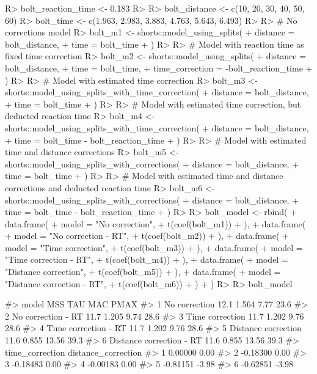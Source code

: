 \documentclass[
]{jss}
\begin{document}
\begin{CodeChunk}
\begin{CodeInput}
R> bolt_reaction_time <- 0.183
R> 
R> bolt_distance <- c(10, 20, 30, 40, 50, 60)
R> bolt_time <- c(1.963, 2.983, 3.883, 4.763, 5.643, 6.493)
R> 
R> # No corrections model
R> bolt_m1 <- shorts::model_using_splits(
+   distance = bolt_distance,
+   time = bolt_time
+ )
R> 
R> # Model with reaction time as fixed time correction
R> bolt_m2 <- shorts::model_using_splits(
+   distance = bolt_distance,
+   time = bolt_time,
+   time_correction = -bolt_reaction_time
+ )
R> 
R> # Model with estimated time correction
R> bolt_m3 <- shorts::model_using_splits_with_time_correction(
+   distance = bolt_distance,
+   time = bolt_time
+ )
R> 
R> # Model with estimated time correction, but deducted reaction time
R> bolt_m4 <- shorts::model_using_splits_with_time_correction(
+   distance = bolt_distance,
+   time = bolt_time - bolt_reaction_time
+ )
R> 
R> # Model with estimated time and distance corrections
R> bolt_m5 <- shorts::model_using_splits_with_corrections(
+   distance = bolt_distance,
+   time = bolt_time
+ )
R> 
R> # Model with estimated time and distance corrections and deducted reaction time
R> bolt_m6 <- shorts::model_using_splits_with_corrections(
+   distance = bolt_distance,
+   time = bolt_time - bolt_reaction_time
+ )
R> 
R> bolt_model <- rbind(
+   data.frame(
+     model = "No correction",
+     t(coef(bolt_m1))
+   ),
+   data.frame(
+     model = "No correction - RT",
+     t(coef(bolt_m2))
+   ),
+   data.frame(
+     model = "Time correction",
+     t(coef(bolt_m3))
+   ),
+   data.frame(
+     model = "Time correction - RT",
+     t(coef(bolt_m4))
+   ),
+   data.frame(
+     model = "Distance correction",
+     t(coef(bolt_m5))
+   ),
+   data.frame(
+     model = "Distance correction - RT",
+     t(coef(bolt_m6))
+   )
+ )
R> 
R> bolt_model
\end{CodeInput}
\begin{CodeOutput}
#>                      model  MSS   TAU   MAC PMAX
#> 1            No correction 12.1 1.564  7.77 23.6
#> 2       No correction - RT 11.7 1.205  9.74 28.6
#> 3          Time correction 11.7 1.202  9.76 28.6
#> 4     Time correction - RT 11.7 1.202  9.76 28.6
#> 5      Distance correction 11.6 0.855 13.56 39.3
#> 6 Distance correction - RT 11.6 0.855 13.56 39.3
#>   time_correction distance_correction
#> 1         0.00000                0.00
#> 2        -0.18300                0.00
#> 3        -0.18483                0.00
#> 4        -0.00183                0.00
#> 5        -0.81151               -3.98
#> 6        -0.62851               -3.98
\end{CodeOutput}
\end{CodeChunk}
\end{document}
